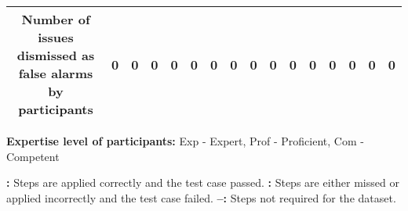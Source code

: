 \begin{table*}[]
\begin{adjustbox}{width=\textwidth,center}
{\begin{tabular}{|cll|ccc|ccc|ccc|ccc|ccc|}
\multicolumn{3}{|c|}{\textbf{Number of issues dismissed as false alarms by participants}}                                                                                                                                                                                                                                                           & \multicolumn{1}{c|}{\textbf{0}}                                                                            & \multicolumn{1}{c|}{\textbf{0}}                                                                           & \textbf{0}                                                    & \multicolumn{1}{c|}{\textbf{0}}                                                                            & \multicolumn{1}{c|}{\textbf{0}}                                                                            & \textbf{0}                                                   & \multicolumn{1}{c|}{\textbf{0}}                                                                           & \multicolumn{1}{c|}{\textbf{0}}                                                                            & \textbf{0}                                                   & \multicolumn{1}{c|}{\textbf{0}}                                                                           & \multicolumn{1}{c|}{\textbf{0}}                                                                            & \textbf{0}                                                   & \multicolumn{1}{c|}{\textbf{0}}                                                                           & \multicolumn{1}{c|}{\textbf{0}}                                                                            & \textbf{0}                                                   \\ \hline
\end{tabular}
}
\label{rq1userstudydata}
\end{adjustbox}

\begin{tablenotes}
 \centering
        \fontsize{7.5pt}{7.5pt}\selectfont
        \item \textbf{Expertise level of participants:} Exp - Expert, Prof - Proficient, Com - Competent
        \item \textbf{\cmark:} Steps are applied correctly and the test case passed.        \textbf{\xmark:} Steps are either missed or applied incorrectly and the test case failed.      \textbf{--:} Steps not required for the dataset.																	
	\end{tablenotes}
     \vspace{-0.2cm}
\end{table*}